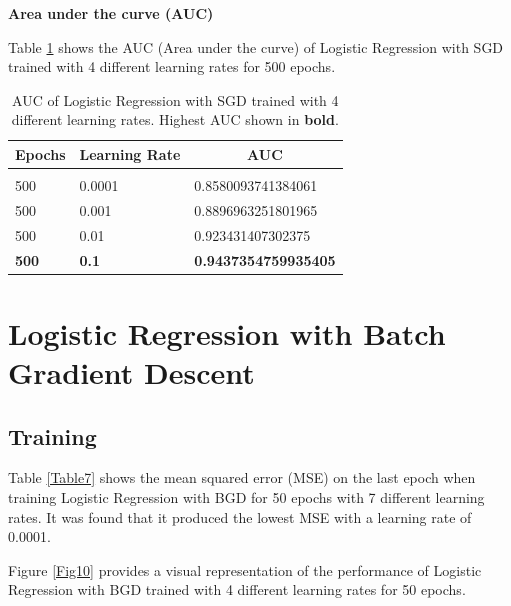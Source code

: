 \documentclass{article} %
\begin{document}
\textbf{Area under the curve (AUC)}

Table \ref{Table6} shows the AUC (Area under the curve) of Logistic Regression with SGD trained with 4 different learning rates for 500 epochs.

\begin{table}[!htbp]
\caption{AUC of Logistic Regression with SGD trained with 4 different learning rates. Highest AUC shown in \textbf{bold}.}
\label{Table6}
\begin{center}
\begin{tabular}{l l l}
\multicolumn{1}{c}{\bf Epochs} &\multicolumn{1}{c}{\bf Learning Rate} &\multicolumn{1}{c}{\bf AUC}
\\ \hline \\

500 & 0.0001 & 0.8580093741384061\\
500 & 0.001  & 0.8896963251801965\\
500 & 0.01   & 0.923431407302375\\

\textbf{500} & \textbf{0.1} & \textbf{0.9437354759935405}\\

\end{tabular}
\end{center}
\end{table}

\section{Logistic Regression with Batch Gradient Descent \cite{ng2000cs229} \cite{roc_curve}}

\subsection{Training}

Table \ref{Table7} shows the mean squared error (MSE) on the last epoch when training Logistic Regression with BGD for 50 epochs with 7 different learning rates. It was found that it produced the lowest MSE with a learning rate of 0.0001.

Figure \ref{Fig10} provides a visual representation of the performance of Logistic Regression with BGD trained with 4 different learning rates for 50 epochs.
\end{document}
